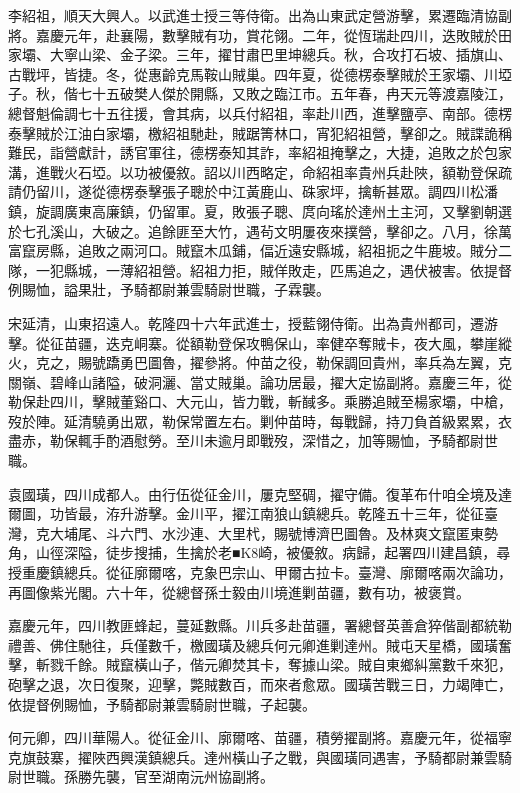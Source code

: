 \begin{pinyinscope}
李紹祖，順天大興人。以武進士授三等侍衛。出為山東武定營游擊，累遷臨清協副將。嘉慶元年，赴襄陽，數擊賊有功，賞花翎。二年，從恆瑞赴四川，迭敗賊於田家壩、大寧山梁、金子梁。三年，擢甘肅巴里坤總兵。秋，合攻打石坡、插旗山、古戰坪，皆捷。冬，從惠齡克馬鞍山賊巢。四年夏，從德楞泰擊賊於王家壩、川埡子。秋，偕七十五破樊人傑於開縣，又敗之臨江市。五年春，冉天元等渡嘉陵江，總督魁倫調七十五往援，會其病，以兵付紹祖，率赴川西，進擊鹽亭、南部。德楞泰擊賊於江油白家壩，檄紹祖馳赴，賊踞箐林口，宵犯紹祖營，擊卻之。賊諜詭稱難民，詣營獻計，誘官軍往，德楞泰知其詐，率紹祖掩擊之，大捷，追敗之於包家溝，進戰火石埡。以功被優敘。詔以川西略定，命紹祖率貴州兵赴陜，額勒登保疏請仍留川，遂從德楞泰擊張子聰於中江黃鹿山、硃家坪，擒斬甚眾。調四川松潘鎮，旋調廣東高廉鎮，仍留軍。夏，敗張子聰、庹向瑤於達州土主河，又擊劉朝選於七孔溪山，大破之。追餘匪至大竹，遇茍文明屢夜來撲營，擊卻之。八月，徐萬富竄房縣，追敗之兩河口。賊竄木瓜鋪，偪近遠安縣城，紹祖扼之牛鹿坡。賊分二隊，一犯縣城，一薄紹祖營。紹祖力拒，賊佯敗走，匹馬追之，遇伏被害。依提督例賜恤，謚果壯，予騎都尉兼雲騎尉世職，子霖襲。

宋延清，山東招遠人。乾隆四十六年武進士，授藍翎侍衛。出為貴州都司，遷游擊。從征苗疆，迭克峒寨。從額勒登保攻鴨保山，率健卒奪賊卡，夜大風，攀崖縱火，克之，賜號蹻勇巴圖魯，擢參將。仲苗之役，勒保調回貴州，率兵為左翼，克關嶺、碧峰山諸隘，破洞灑、當丈賊巢。論功居最，擢大定協副將。嘉慶三年，從勒保赴四川，擊賊董谿口、大元山，皆力戰，斬馘多。乘勝追賊至楊家壩，中槍，歿於陣。延清驍勇出眾，勒保常置左右。剿仲苗時，每戰歸，持刀負首級累累，衣盡赤，勒保輒手酌酒慰勞。至川未逾月即戰歿，深惜之，加等賜恤，予騎都尉世職。

袁國璜，四川成都人。由行伍從征金川，屢克堅碉，擢守備。復革布什咱全境及達爾圖，功皆最，洊升游擊。金川平，擢江南狼山鎮總兵。乾隆五十三年，從征臺灣，克大埔尾、斗六門、水沙連、大里杙，賜號博濟巴圖魯。及林爽文竄匿東勢角，山徑深隘，徒步搜捕，生擒於老■K8崎，被優敘。病歸，起署四川建昌鎮，尋授重慶鎮總兵。從征廓爾喀，克象巴宗山、甲爾古拉卡。臺灣、廓爾喀兩次論功，再圖像紫光閣。六十年，從總督孫士毅由川境進剿苗疆，數有功，被褒賞。

嘉慶元年，四川教匪蜂起，蔓延數縣。川兵多赴苗疆，署總督英善倉猝偕副都統勒禮善、佛住馳往，兵僅數千，檄國璜及總兵何元卿進剿達州。賊屯天星橋，國璜奮擊，斬戮千餘。賊竄橫山子，偕元卿焚其卡，奪據山梁。賊自東鄉糾黨數千來犯，砲擊之退，次日復聚，迎擊，斃賊數百，而來者愈眾。國璜苦戰三日，力竭陣亡，依提督例賜恤，予騎都尉兼雲騎尉世職，子起襲。

何元卿，四川華陽人。從征金川、廓爾喀、苗疆，積勞擢副將。嘉慶元年，從福寧克旗鼓寨，擢陜西興漢鎮總兵。達州橫山子之戰，與國璜同遇害，予騎都尉兼雲騎尉世職。孫勝先襲，官至湖南沅州協副將。


\end{pinyinscope}
